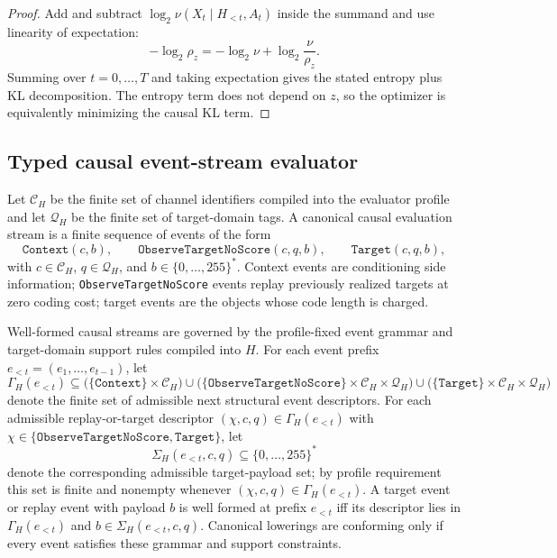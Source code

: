 \documentclass[11pt]{article}
\begin{document}
\begin{proof}
Add and subtract
$\log_2 \nu(X_t\mid H_{<t},A_t)$ inside the summand and use linearity of
expectation:
\[
-\log_2 \rho_z
=
-\log_2 \nu
+
\log_2\frac{\nu}{\rho_z}.
\]
Summing over $t=0,\dots,T$ and taking expectation gives the stated entropy plus
KL decomposition. The entropy term does not depend on $z$, so the optimizer is
equivalently minimizing the causal KL term.
\end{proof}

\subsection{Typed causal event-stream evaluator}
\label{subsec:typed-causal-eval}

Let $\mathcal{C}_H$ be the finite set of channel identifiers compiled into the
evaluator profile and let $\mathcal{Q}_H$ be the finite set of target-domain
tags. A canonical causal evaluation stream is a finite sequence of events of
the form
\[
\texttt{Context}(c,b),
\qquad
\texttt{ObserveTargetNoScore}(c,q,b),
\qquad
\texttt{Target}(c,q,b),
\]
with $c\in\mathcal{C}_H$, $q\in\mathcal{Q}_H$, and
$b\in\{0,\dots,255\}^*$. Context events are conditioning side information;
\texttt{ObserveTargetNoScore} events replay previously realized targets at zero
coding cost; target events are the objects whose code length is charged.

Well-formed causal streams are governed by the profile-fixed event grammar and
target-domain support rules compiled into $H$. For each event prefix
$e_{<t}=(e_1,\dots,e_{t-1})$, let
\[
\Gamma_H(e_{<t})
\subseteq
\bigl(\{\texttt{Context}\}\times\mathcal{C}_H\bigr)
\cup
\bigl(\{\texttt{ObserveTargetNoScore}\}\times\mathcal{C}_H\times\mathcal{Q}_H\bigr)
\cup
\bigl(\{\texttt{Target}\}\times\mathcal{C}_H\times\mathcal{Q}_H\bigr)
\]
denote the finite set of admissible next structural event descriptors. For each
admissible replay-or-target descriptor
$(\chi,c,q)\in\Gamma_H(e_{<t})$ with
$\chi\in\{\texttt{ObserveTargetNoScore},\texttt{Target}\}$, let
\[
\Sigma_H(e_{<t},c,q)\subseteq\{0,\dots,255\}^*
\]
denote the corresponding admissible target-payload set; by profile
requirement this set is finite and nonempty whenever
$(\chi,c,q)\in\Gamma_H(e_{<t})$. A target event
or replay event with payload $b$ is well formed at prefix $e_{<t}$ iff its
descriptor lies in $\Gamma_H(e_{<t})$ and
$b\in\Sigma_H(e_{<t},c,q)$. Canonical lowerings are conforming only if every
event satisfies these grammar and support constraints.
\end{document}
